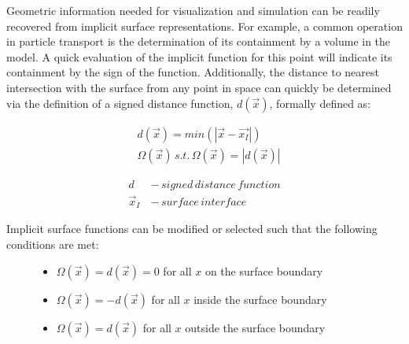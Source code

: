 Geometric information needed for visualization and simulation can be
readily recovered from implicit surface representations. For example, a common
operation in particle transport is the determination of its containment by a
volume in the model. A quick evaluation of the implicit function for this point
will indicate its containment by the sign of the function.
Additionally, the distance to nearest intersection with the surface from any
point in space can quickly be determined via the definition of a signed distance
function, $d(\vec{x})$, formally defined as:

\begin{align} \label{eq:sdf}
  & d(\vec{x}) = min(|\vec{x} - \vec{x_{I}}|) \\
  & \Omega(\vec{x})  \,s.t.  \, \Omega(\vec{x}) = |d(\vec{x})|
\end{align}

\begin{align}
  d \, &- \, signed \, distance \, function \\
  \vec{x}_{I} \, &- \,surface \, interface
\end{align}

\noindent

Implicit surface functions can be modified or selected such that the following
conditions are met:

\begin{figure}[H]
  \begin{center}
    \begin{minipage}{.8\textwidth}
      \begin{itemize}
      \item $ \Omega(\vec{x}) = d(\vec{x}) = 0 $ for all $x$ on the surface boundary
      \item $ \Omega(\vec{x}) = -d(\vec{x}) $ for all $x$ inside the surface boundary
      \item $ \Omega(\vec{x}) = d(\vec{x}) $ for all $x$ outside the surface boundary
      \end{itemize}
    \end{minipage}
  \end{center}
\end{figure}

